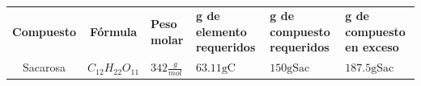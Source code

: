 \begin{table}[H]
\centering
\caption{}
\label{tab:}
\begin{threeparttable}
{
\begin{tabular}{cc}\hline

    \textbf{Compuesto} & \textbf{Fórmula} & \textbf{Peso molar} & \textbf{g de elemento requeridos} & \textbf{g de compuesto requeridos} & \textbf{g de compuesto en exceso} \\
    Sacarosa & $C_{12}H_{22}O_{11}$ & $342 \frac{g}{mol}$ & $63.11\text{gC}$ & $150\text{gSac}$ & $187.5\text{gSac}$ \\
    
    \hline
\end{tabular}
}
\begin{tablenotes} %
    \item[] 
\end{tablenotes}
\end{threeparttable}
\end{table}